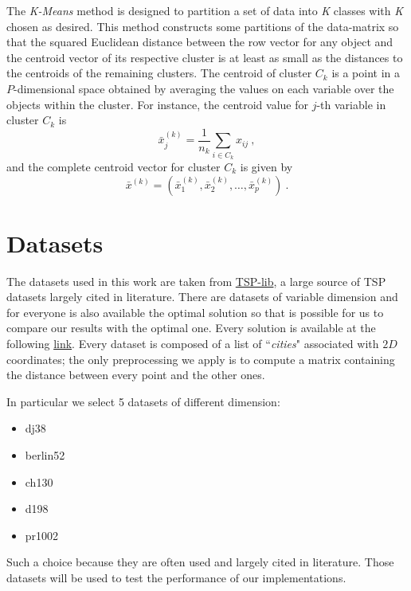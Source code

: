 \documentclass[10pt]{article}
\begin{document}
The \textit{K-Means} method is designed to partition a set of data into \textit{K} classes with \textit{K} chosen as desired.
This method constructs some partitions of the data-matrix so that the squared Euclidean distance between the row vector for any object and the centroid vector of its respective cluster is at least as small as the distances to the centroids of the remaining clusters.
The centroid of cluster $C_k$ is a point in a $P$-dimensional space obtained by averaging the values on each variable over the objects within the cluster. For instance, the centroid value for $j$-th variable in cluster $C_k$ is
\begin{equation}
\bar{x}_{j}^{(k)} = \frac{1}{n_k} \sum_{i \in C_k} x_{ij}~,
\end{equation}
and the complete centroid vector for cluster $C_k$ is given by \cite{ventidue}
\begin{equation}
\bar{x}^{(k)}  = (\bar{x}_1^{(k)},\bar{x}_2^{(k)},\dots,\bar{x}_p^{(k)})~.
\end{equation}

\section{Datasets} \label{sec:data}
The datasets used in this work are taken from  \href{https://wwwproxy.iwr.uni-heidelberg.de/groups/comopt/software/TSPLIB95/tsp/}{TSP-lib}, a large source of TSP datasets largely cited in literature. 
There are datasets of variable dimension and for everyone is also available the optimal solution so that is possible for us to compare our results with the optimal one. 
Every solution is available at the following \href{https://wwwproxy.iwr.uni-heidelberg.de/groups/comopt/software/TSPLIB95/STSP.html}{link}. 
Every dataset is composed of a list of ``\textit{cities}" associated with $2D$ coordinates; the only preprocessing we apply is to compute a matrix containing the distance between every point and the other ones.

In particular we select 5 datasets of different dimension:
\begin{itemize}[noitemsep]
\item dj38
\item berlin52
\item ch130
\item d198
\item pr1002
\end{itemize}
Such a choice because they are often used and largely cited in literature.
Those datasets will be used to test the performance of our implementations.
\vfill
\newpage
\end{document}
